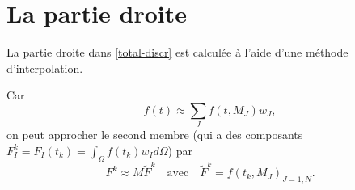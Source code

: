 \documentclass[12pt]{article}
\begin{document}
\section{La partie droite}
La partie droite dans \eqref{total-discr} est calculée à l'aide d'une méthode d'interpolation.

Car
\begin{equation*}
	f(t) \approx \sum_{J} f(t,M_J)w_J,
\end{equation*}
on peut approcher le second membre (qui a des composants $F^k_I = F_I(t_k) = \int_\Omega f(t_k) w_I d\Omega$) par
\begin{equation*}
	F^k \approx M\tilde{F}^k \quad \text{avec} \quad \tilde{F}^k = f(t_k,M_J)_{J=1,N}.
\end{equation*}
\end{document}
